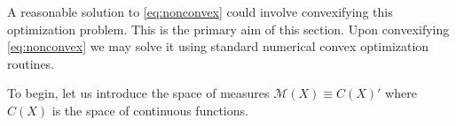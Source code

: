 A reasonable solution to \eqref{eq:nonconvex} could involve convexifying this optimization problem.
This is the primary aim of this section.  Upon convexifying \eqref{eq:nonconvex} we may solve it using standard numerical convex optimization routines.

To begin, let us introduce the space of measures $\mathcal{M}(X) \equiv C(X)'$ where $C(X)$ is the space of continuous functions.
